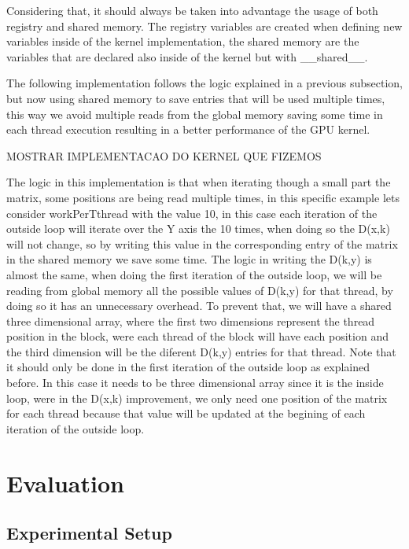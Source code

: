 \documentclass[runningheads]{llncs}
\begin{document}
Considering that, it should always be taken into advantage the usage of both registry and shared memory. The registry variables are created when defining
new variables inside of the kernel implementation, the shared memory are the variables that are declared also inside of the kernel but with \_\_shared\_\_.

The following implementation follows the logic explained in a previous subsection, but now using shared memory to save entries that will be used
 multiple times, this way we avoid multiple reads from the global memory saving some time in each thread execution resulting in a better performance 
 of the GPU kernel.

 MOSTRAR IMPLEMENTACAO DO KERNEL QUE FIZEMOS

 The logic in this implementation is that when iterating though a small part the matrix, some positions are being read multiple times, in this specific 
 example lets consider workPerTthread with the value 10, in this case each iteration of the outside loop will iterate over the Y axis the 10 times, when
 doing so the D(x,k) will not change, so by writing this value in the corresponding entry of the matrix in the shared memory we save some time. The logic
 in writing the D(k,y) is almost the same, when doing the first iteration of the outside loop, we will be reading from global memory all the possible 
 values of D(k,y) for that thread, by doing so it has an unnecessary overhead. To prevent that, we will have a shared three dimensional array, where the
 first two dimensions represent the thread position in the block, were each thread of the block will have each position and the third dimension will be 
 the diferent D(k,y) entries for that thread. Note that it should only be done in the first iteration of the outside loop as explained before.
  In this case it needs to be three dimensional array since it is the inside loop, were in the D(x,k) improvement, we only need one position of the matrix
  for each thread because that value will be updated at the begining of each iteration of the outside loop.

\section{Evaluation}

\subsection{Experimental Setup}
\end{document}
